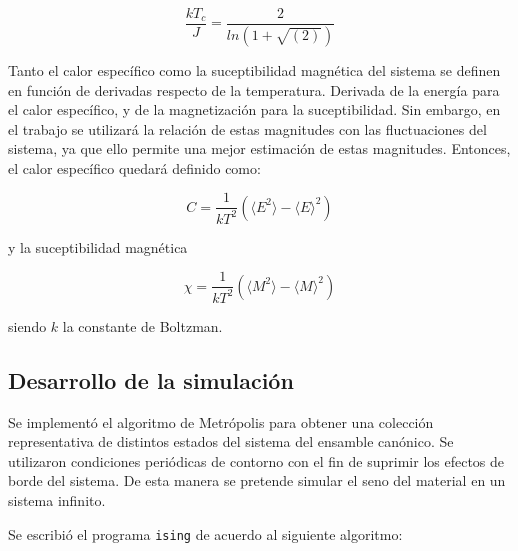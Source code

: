 \documentclass[a4paper,12pt]{article}
\begin{document}
\begin{equation}
\frac{k T_c }{J} = \frac{2}{ln(1+\sqrt{(2)})}
\end{equation}

Tanto el calor específico como la suceptibilidad magnética del sistema se 
definen en función de derivadas respecto de la temperatura. Derivada de la 
energía para el calor específico, y de la magnetización para la suceptibilidad. 
Sin embargo, en el trabajo se utilizará la relación de estas magnitudes con las 
fluctuaciones del sistema, ya que ello permite una mejor estimación de estas 
magnitudes. Entonces, el calor específico quedará definido como:

\begin{equation}
C  = \frac{1}{kT^2} \left(\langle E^2\rangle - \langle E \rangle^2\right)
\end{equation}

\noindent y la suceptibilidad magnética

\begin{equation}
\chi = \frac{1}{kT^2} \left(\langle M^2\rangle - \langle M \rangle^2\right)
\end{equation}

\noindent siendo $k$ la constante de Boltzman.

\subsection{Desarrollo de la simulación}

Se implementó el algoritmo de Metrópolis para obtener una colección 
representativa de distintos estados del sistema del ensamble canónico. Se 
utilizaron condiciones periódicas de contorno con el fin de suprimir los 
efectos de borde del sistema. De esta manera se pretende simular el seno del 
material en un sistema infinito.

Se escribió el programa \texttt{ising} de acuerdo al siguiente algoritmo:
\end{document}
